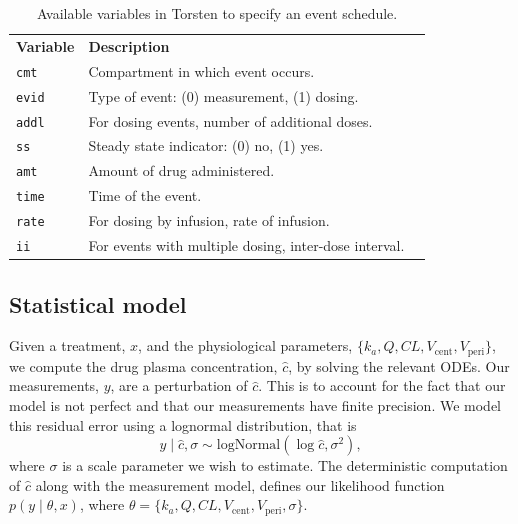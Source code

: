 \begin{table}
  \renewcommand{\arraystretch}{1.5}
  \begin{center}
  \begin{tabular} {l l l}
  \rowcolor[gray]{0.95} \textbf{Variable} & \textbf{Description} \\
  \texttt{cmt} & Compartment in which event occurs.\\
  \rowcolor[gray]{0.95} \texttt{evid} & Type of event: (0) measurement, (1) dosing. \\
  \texttt{addl} & For dosing events, number of additional doses.  \\
  \rowcolor[gray]{0.95} \texttt{ss} & Steady state indicator: (0) no, (1) yes. \\
  \texttt{amt} & Amount of drug administered. \\
  \rowcolor[gray]{0.95} \texttt{time} & Time of the event. \\
  \texttt{rate} & For dosing by infusion, rate of infusion. \\
  \rowcolor[gray]{0.95} \texttt{ii} & For events with multiple dosing, inter-dose interval.
  \end{tabular}
  \end{center}
  \caption{Available variables in Torsten to specify an event schedule.}
  \label{tab:event_schedule}
\end{table}

\subsection{Statistical model}

Given a treatment, $x$, and the physiological parameters, $\{ k_a, Q, CL, V_\mathrm{cent}, V_\mathrm{peri} \}$, we compute the drug plasma concentration, $\hat c$, by solving the relevant ODEs.
Our measurements, $y$, are a perturbation of $\hat c$.
This is to account for the fact that our model is not perfect and that our measurements have finite precision.
We model this residual error using a lognormal distribution, that is
\begin{equation*}
  y \mid \hat c, \sigma \sim \mathrm{logNormal}(\log \hat c, \sigma^2),
\end{equation*}
where $\sigma$ is a scale parameter we wish to estimate.
The deterministic computation of $\hat c$ along with the measurement model, defines our likelihood function $p(y \mid \theta, x)$, where $\theta = \{ k_a, Q, CL, V_\mathrm{cent}, V_\mathrm{peri}, \sigma \}$.

